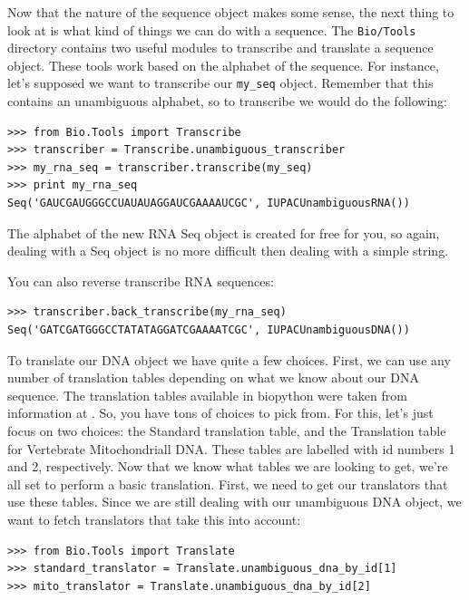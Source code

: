 \documentclass{article}
\begin{document}
Now that the nature of the sequence object makes some sense, the next thing to look at is what kind of things we can do with a sequence. The \verb|Bio/Tools| directory contains two useful modules to transcribe and translate a sequence object. These tools work based on the alphabet of the sequence. For instance, let's supposed we want to transcribe our \verb|my_seq| object. Remember that this contains an unambiguous alphabet, so to transcribe we would do the following:

\begin{verbatim}
>>> from Bio.Tools import Transcribe
>>> transcriber = Transcribe.unambiguous_transcriber
>>> my_rna_seq = transcriber.transcribe(my_seq)
>>> print my_rna_seq
Seq('GAUCGAUGGGCCUAUAUAGGAUCGAAAAUCGC', IUPACUnambiguousRNA())
\end{verbatim}

The alphabet of the new RNA Seq object is created for free for you, so again, dealing with a Seq object is no more difficult then dealing with a simple string.


You can also reverse transcribe RNA sequences:

\begin{verbatim}
>>> transcriber.back_transcribe(my_rna_seq)
Seq('GATCGATGGGCCTATATAGGATCGAAAATCGC', IUPACUnambiguousDNA())
\end{verbatim}


To translate our DNA object we have quite a few choices. First, we can use any number of translation tables depending on what we know about our DNA sequence. The translation tables available in biopython were taken from information at . So, you have tons of choices to pick from. For this, let's just focus on two choices: the Standard translation table, and the Translation table for Vertebrate Mitochondriall DNA. These tables are labelled with id numbers 1 and 2, respectively. Now that we know what tables we are looking to get, we're all set to perform a basic translation. First, we need to get our translators that use these tables. Since we are still dealing with our unambiguous DNA object, we want to fetch translators that take this into account:

\begin{verbatim}
>>> from Bio.Tools import Translate
>>> standard_translator = Translate.unambiguous_dna_by_id[1] 
>>> mito_translator = Translate.unambiguous_dna_by_id[2]
\end{verbatim}
\end{document}
